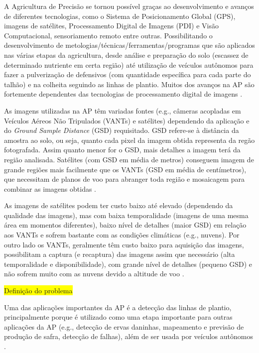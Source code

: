 \documentclass[12pt, a4paper, english, brazil]{article}
\newcommand{\boxYellow}[1]{\colorbox{yellow}{#1}}
\begin{document}
A Agricultura de Precisão se tornou possível graças ao desenvolvimento e avanços de diferentes tecnologias, como o Sistema de Posicionamento Global (GPS), imagens de satélites, Processamento Digital de Imagens (PDI) e Visão Computacional, sensoriamento remoto entre outras. Possibilitando o desenvolvimento de metologias/técnicas/ferramentas/programas que são aplicados nas várias etapas da agricultura, desde análise e preparação do solo (escassez de determinado nutriente em certa região) até utilização de veículos autônomos para fazer a pulverização de defensivos (com quantidade específica para cada parte do talhão) e na colheita seguindo as linhas de plantio. Muitos dos avanços na AP são fortemente dependentes das tecnologias de processamento digital de imagens \cite{Bolfe_2020}.

As imagens utilizadas na AP têm variadas fontes (e.g., câmeras acopladas em Veículos Aéreos Não Tripulados (VANTs) e satélites) dependendo da aplicação e do \textit{Ground Sample Distance} (GSD) requisitado. GSD refere-se à distância da amostra ao solo, ou seja, quanto cada pixel da imagem obtida representa da regão fotografada. Assim quanto menor for o GSD, mais detalhes a imagem terá da região analisada. Satélites (com GSD em média de metros) conseguem imagem de grande regiões mais facilmente que os VANTs (GSD em média de centímetros), que necessitam de planos de voo para abranger toda região e mosaicagem para combinar as imagens obtidas \cite{Messina_2020}.

As imagens de satélites podem ter custo baixo até elevado (dependendo da qualidade das imagens), mas com baixa temporalidade (imagens de uma mesma área em momentos diferentes), baixo nível de detalhes (maior GSD) em relação aos VANTs e sofrem bastante com as condições climáticas (e.g., nuvens). Por outro lado os VANTs, geralmente têm custo baixo para aquisição das imagens, possibilitam a captura (e recaptura) das imagens assim que necessário (alta temporalidade e disponibilidade), com grande nível de detalhes (pequeno GSD) e não sofrem muito com as nuvens devido a altitude de voo \cite{Candiago_2015, Delavarpour_2021}.

\boxYellow{Definição do problema}

Uma das aplicações importantes da AP é a detecção das linhas de plantio, principalmente porque é utilizado como uma etapa importante para outras aplicações da AP (e.g., detecção de ervas daninhas, mapeamento e previsão de produção de safra, detecção de falhas), além de ser usada por veículos autônomos \cite{Hassanein_2019}.
\end{document}
